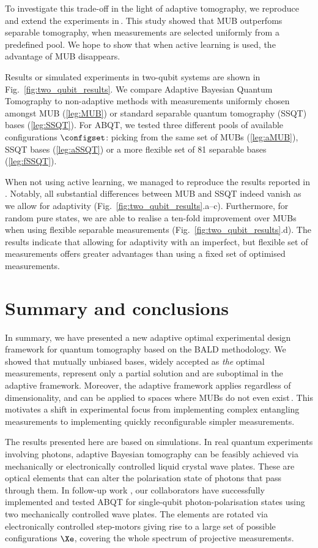 To investigate this trade-off in the light of adaptive tomography, we reproduce and extend the experiments in\,\citep{MUBExperiment}. This study showed that MUB outperfoms separable tomography, when measurements are selected uniformly from a predefined pool. We hope to show that when active learning is used, the advantage of MUB disappears.

Results or simulated experiments in two-qubit systems are shown in Fig.\ \ref{fig:two_qubit_results}. We compare Adaptive Bayesian Quantum Tomography to non-adaptive methods with measurements uniformly chosen amongst MUB (\ref{leg:MUB}) or standard separable quantum tomography (SSQT) bases (\ref{leg:SSQT}). For ABQT, we tested three different pools of available configurations $\configset$: picking from the same set of MUBs (\ref{leg:aMUB}), SSQT bases (\ref{leg:aSSQT}) or a more flexible set of 81 separable bases (\ref{leg:fSSQT}).

When not using active learning, we managed to reproduce the results reported in \citep{MUBExperiment}. Notably, all substantial differences between MUB and SSQT indeed vanish as we allow for adaptivity (Fig.\ \ref{fig:two_qubit_results}.a--c). Furthermore, for random pure states, we are able to realise a ten-fold improvement over MUBs when using flexible separable measurements (Fig.\ \ref{fig:two_qubit_results}.d). The results indicate that allowing for adaptivity with an imperfect, but flexible set of measurements offers greater advantages than using a fixed set of optimised measurements.

\section{Summary and conclusions}

In summary, we have presented a new adaptive optimal experimental design framework for quantum tomography based on the BALD methodology. We showed that mutually unbiased bases, widely accepted as \emph{the} optimal measurements, represent only a partial solution and are suboptimal in the adaptive framework. Moreover, the adaptive framework applies regardless of dimensionality, and can be applied to spaces where MUBs do not even exist\,\citep{DimensionSix,ExactInformation}. This motivates a shift in experimental focus from implementing complex entangling measurements to implementing quickly reconfigurable simpler measurements.
	
The results presented here are based on simulations. In real quantum experiments involving photons, adaptive Bayesian tomography can be feasibly achieved via mechanically or electronically controlled liquid crystal wave plates. These are optical elements that can alter the polarisation state of photons that pass through them. In follow-up work \citep{Kravrsov13PRA}, our collaborators have successfully implemented and tested ABQT for single-qubit photon-polarisation states using two mechanically controlled wave plates. The elements are rotated via electronically controlled step-motors giving rise to a large set of possible configurations $\Xe$, covering the whole spectrum of projective measurements.


